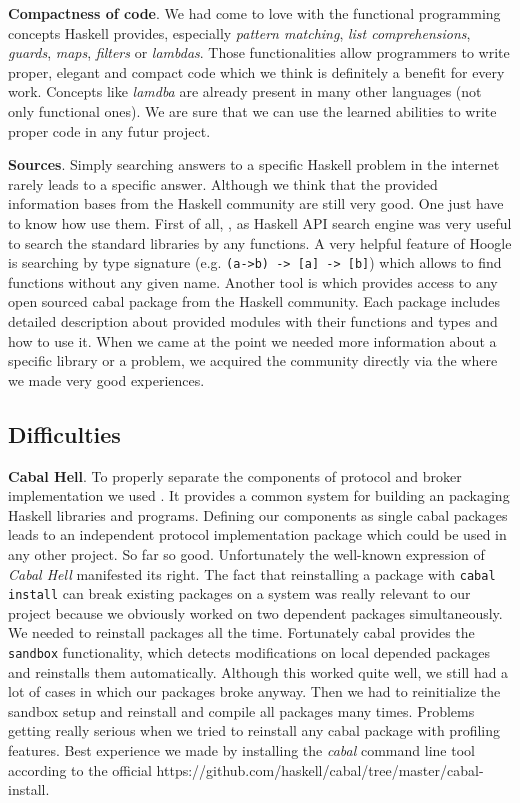 {\bf Compactness of code}. We had come to love with the functional
programming concepts Haskell provides, especially \textit{pattern matching}, \textit{list
comprehensions}, \textit{guards}, \textit{maps}, \textit{filters} or
\textit{lambdas}. Those functionalities allow programmers to write proper,
elegant and compact code which we think is definitely a benefit for every
work. Concepts like \textit{lamdba} are already present in many other
languages (not only functional ones). We are sure that we can use the learned abilities
to write proper code in any futur project. 

{\bf Sources}. Simply searching answers to a specific Haskell problem in the
internet rarely leads to a specific answer. Although we think that the provided
information bases from the Haskell community are still very good. One just have
to know how use them. First of all,
, as Haskell API search engine
was very useful to search the standard libraries by any functions. A very
helpful feature of Hoogle is searching by type signature (e.g.
\lstinline{(a->b) -> [a] -> [b]}) which allows to find functions without any
given name. Another tool is 
which provides access to any open sourced cabal package from the Haskell
community. Each package includes detailed description about provided modules
with their functions and types and how to use it. When we came at the point we
needed more information about a specific library or a problem, we acquired the
community directly via the  where we made very good
experiences.

\subsection{Difficulties} {\bf Cabal Hell}. To properly separate the components
of protocol and broker
implementation  we used .
It provides a common system for building an packaging Haskell libraries and
programs. Defining our components as single cabal packages leads to an
independent protocol implementation package which could be used in any other
project. So far so good. Unfortunately the well-known expression of
\textit{Cabal Hell} manifested its right. The fact that reinstalling a package
with \lstinline{cabal install} can break existing packages on a system was
really relevant to our project because we obviously worked on two dependent
packages simultaneously. We needed to reinstall packages all the time.
Fortunately cabal provides the \lstinline{sandbox} functionality, which detects
modifications on local depended packages and reinstalls them automatically.
Although this worked quite well, we still had a lot of cases in which our
packages broke anyway. Then we had to reinitialize the sandbox setup and
reinstall and compile all packages many times. Problems getting really serious
when we tried to reinstall any cabal package with profiling features. Best
experience we made by installing the \textit{cabal} command line tool according
to the official 
{https://github.com/haskell/cabal/tree/master/cabal-install}.

